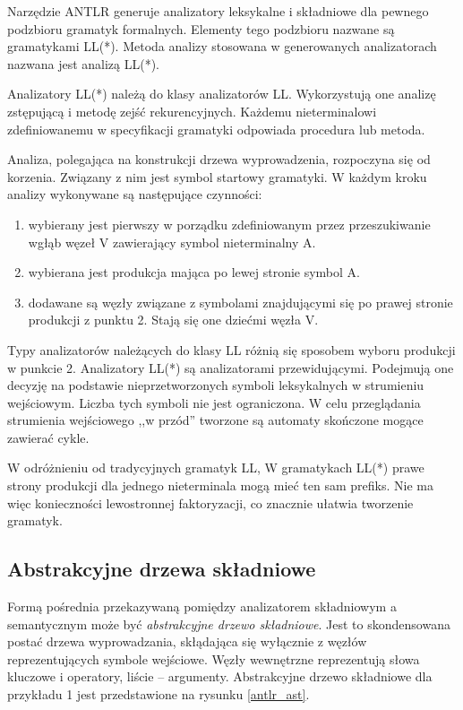 Narzędzie ANTLR generuje analizatory leksykalne i składniowe dla pewnego podzbioru
gramatyk formalnych. Elementy tego podzbioru nazwane są gramatykami LL(*). Metoda 
analizy stosowana w generowanych analizatorach nazwana jest analizą LL(*). 

Analizatory LL(*) należą do klasy analizatorów LL. Wykorzystują one
analizę zstępującą i metodę zejść 
rekurencyjnych. Każdemu nieterminalowi zdefiniowanemu w specyfikacji gramatyki
odpowiada procedura lub metoda. 

Analiza, polegająca na konstrukcji drzewa
wyprowadzenia, rozpoczyna się od korzenia. Związany z nim jest symbol 
startowy gramatyki. W każdym kroku analizy wykonywane są następujące czynności:
\begin{enumerate}
\item wybierany jest pierwszy w porządku zdefiniowanym przez
  przeszukiwanie wgłąb węzeł V zawierający symbol nieterminalny A.
\item wybierana jest produkcja mająca po lewej stronie symbol A.
\item dodawane są węzły związane z symbolami znajdującymi się po prawej
  stronie produkcji z punktu 2. Stają się one dziećmi węzła V.
\end{enumerate}

Typy analizatorów należących do klasy LL różnią się sposobem wyboru produkcji w punkcie 2. 
Analizatory LL(*) są analizatorami przewidującymi. Podejmują one decyzję na
podstawie nieprzetworzonych symboli leksykalnych w strumieniu wejściowym. Liczba
tych symboli nie jest ograniczona. W celu przeglądania strumienia wejściowego 
,,w przód'' tworzone są automaty skończone mogące zawierać cykle.

W odróżnieniu od tradycyjnych gramatyk LL, W gramatykach LL(*) prawe strony
produkcji dla jednego nieterminala mogą mieć ten sam prefiks. Nie ma więc 
konieczności lewostronnej faktoryzacji, co znacznie ułatwia tworzenie
gramatyk.

\subsection{Abstrakcyjne drzewa składniowe}

Formą pośrednia przekazywaną pomiędzy analizatorem składniowym a semantycznym
może być \emph{abstrakcyjne drzewo składniowe}. Jest to skondensowana postać drzewa
wyprowadzania, skłądająca się
wyłącznie z węzłów reprezentujących symbole wejściowe. Węzły
wewnętrzne reprezentują słowa kluczowe i operatory, liście -- argumenty.
Abstrakcyjne drzewo składniowe dla przykładu 1 jest przedstawione na rysunku 
\ref{antlr_ast}.

